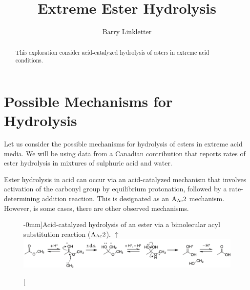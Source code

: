 \documentclass[]{tufte-handout}
\title{Extreme Ester Hydrolysis}
\author[Barry Linkletter]{Barry Linkletter}
\date{} %
\begin{document}
\justifying
\maketitle
{}

\begin{abstract}

\noindent This exploration consider acid-catalyzed hydrolysis of esters in extreme acid conditions.

\end{abstract}





\section{Possible Mechanisms for Hydrolysis}

Let us consider the possible mechanisms for hydrolysis of esters in extreme acid media. We will be using data from a Canadian contribution that reports rates of ester hydrolysis in mixtures of sulphuric acid and water.

Ester hydrolysis in acid can occur via an acid-catalyzed mechanism that involves activation of the carbonyl group by equilibrium protonation, followed by a rate-determining addition reaction. This is designated as an $\rm A_{Ac}2$ mechanism. However, is some cases, there are other observed mechanisms.


\begin{figure}[h!]
  \centering
  \caption[][-0mm]{Acid-catalyzed hydrolysis of an ester via a bimolecular acyl substitution reaction ($\rm A_{Ac}2$). $\uparrow$} 
  \includegraphics[scale=0.7]{images/AAc2}
  \label{fig:fig1}
\end{figure}
\end{document}
